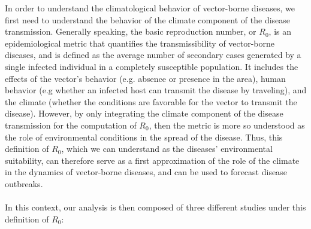 \documentclass[article,10pt,twocolumn]{wlscirep}
\begin{document}
  In order to understand the climatological behavior of vector-borne diseases, we first need to understand the behavior of the climate component of the disease transmission. Generally speaking, the basic reproduction number, or $R_0$, is an epidemiological metric that quantifies the transmissibility of vector-borne diseases, and is defined as the average number of secondary cases generated by a single infected individual in a completely susceptible population. It includes the effects of the vector's behavior (e.g. absence or presence in the area), human behavior (e.g whether an infected host can transmit the disease by traveling), and the climate (whether the conditions are favorable for the vector to transmit the disease). However, by only integrating the climate component of the disease transmission for the computation of $R_0$, then the metric is more so understood as the role of environmental conditions in the spread of the disease. Thus, this definition of $R_0$, which we can understand as the diseases' environmental suitability, can therefore serve as a first approximation of the role of the climate in the dynamics of vector-borne diseases, and can be used to forecast disease outbreaks.
\\
\\
  In this context, our analysis is then composed of three different studies under this definition of $R_0$:
  
\end{document}
